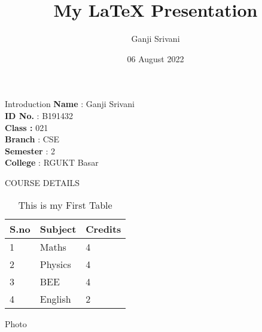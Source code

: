 \documentclass{beamer}
\title{My \LaTeX{}  Presentation}
\author{Ganji Srivani}
\date{06 August 2022}
\begin{document}
\begin{frame}
\titlepage
\end{frame}

\begin{frame}{Introduction}
\centering
\textbf{Name} : Ganji Srivani \\
\textbf{ID No.} : B191432 \\
\textbf{Class :} 021 \\
\textbf{Branch} : CSE \\
\textbf{Semester} : 2 \\
\textbf{College} : RGUKT Basar \\
\end{frame}

\begin{frame}{COURSE DETAILS}
\begin{table}
\caption{This is my First Table}
\begin{tabular}{|l |l |l |}

 \hline
 S.no & Subject & Credits \\
 \hline
 1 & Maths & 4 \\
 \hline
 2 & Physics & 4 \\
 \hline
 3 & BEE & 4 \\
 \hline
 4 & English & 2 \\
 \hline
 
\end{tabular}
\label{table1}
\end{table}
\end{frame}

\begin{frame}{Photo}
\end{frame}
\end{document}
